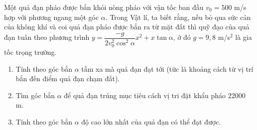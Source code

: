 \begin{bt}%
	Một quả đạn pháo được bắn khỏi nòng pháo với vận tốc ban đầu $v_0=500$ m/s hợp với phương ngang một góc $\alpha $. Trong Vật lí, ta biết rằng, nếu bỏ qua sức cản của không khí và coi quả đạn pháo được bắn ra từ mặt đất thì quỹ đạo của quả đạn tuân theo phương trình $y=\dfrac{-g}{2v_0^2 \cos^2\alpha}x^2+x \tan\alpha $, ở đó $g=9{,}8$ m/s$^2$ là gia tốc trọng trường.
	\begin{enumerate}
		\item Tính theo góc bắn $\alpha $ tầm xa mà quả đạn đạt tới (tức là khoảng cách từ vị trí bắn đến điểm quả đạn chạm đất).
		\item Tìm góc bắn $\alpha $ để quả đạn trúng mục tiêu cách vị tri đặt khẩu pháo $22000$ m.
		\item Tính theo góc bắn $\alpha$ độ cao lớn nhất của quả đạn có thể đạt được.
	\end{enumerate}
\end{bt}
